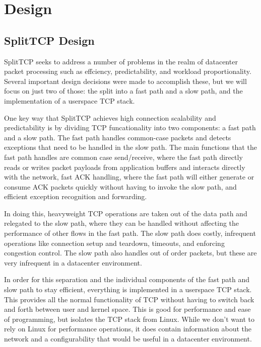 \section{Design}

\subsection{SplitTCP Design}

SplitTCP seeks to address a number of problems in the realm of datacenter packet
processing such as effciency, predictability, and workload proportionality. 
Several important design decisions were made to accomplish these, but we will 
focus on just two of those: the split into a fast path and a slow path, and the
implementation of a userspace TCP stack.

One key way that SplitTCP achieves high connection scalability and 
predictability is by dividing TCP funcationality into two components: a fast 
path and a slow path. The fast path handles common-case packets and detects 
exceptions that need to be handled in the slow path. The main functions that
the fast path handles are common case send/receive, where the fast path directly
reads or writes packet payloads from application buffers and interacts directly
with the network, fast ACK handling, where the fast path will either generate or
consume ACK packets quickly without having to invoke the slow path, and 
efficient exception recognition and forwarding. 

In doing this, heavyweight TCP operations are taken out of the data path and 
relegated to the slow path, where they can be handled without affecting the 
performance of other flows in the fast path. The slow path does costly, 
infrequent operations like connection setup and teardown, timeouts, and 
enforcing congestion control. The slow path also handles out of order packets, 
but these are very infrequent in a datacenter environment.
   
In order for this separation and the individual components of the fast path 
and slow path to stay efficient, everything is implemented in a userspace TCP
stack. This provides all the normal functionality of TCP without having to 
switch back and forth between user and kernel space. This is good for 
performance and ease of programming, but isolates the TCP stack from Linux.
While we don't want to rely on Linux for performance operations, it does contain
information about the network and a configurability that would be useful in a 
datacenter environment.

